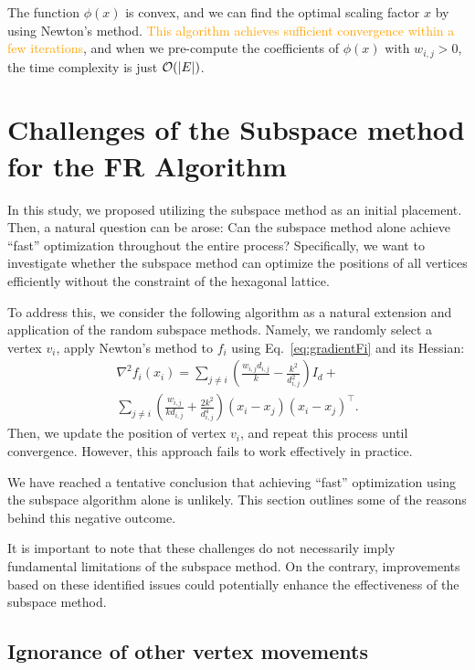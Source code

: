 \documentclass[dvipdfmx,lettersize,journal]{IEEEtran}
\newcommand{\orange}[1]{\textcolor{orange}{#1}}
\begin{document}
The function $\phi(x)$ is convex, and we can find the optimal scaling factor $x$ by using Newton's method.
\orange{This algorithm achieves sufficient convergence within a few iterations}, and when we pre-compute the coefficients of $\phi(x)$ with $w_{i,j} > 0$, the time complexity is just $\order{\abs{E}}$.

\section{Challenges of the Subspace method for the FR Algorithm}\label{sec:problemOfSubspace}

In this study, we proposed utilizing the subspace method as an initial placement. Then, a natural question can be arose: Can the subspace method alone achieve ``fast'' optimization throughout the entire process?
Specifically, we want to investigate whether the subspace method can optimize the positions of all vertices efficiently without the constraint of the hexagonal lattice.

To address this, we consider the following algorithm as a natural extension and application of the random subspace methods. Namely, we randomly select a vertex $v_i$, apply Newton's method to $f_i$ using Eq.~\ref{eq:gradientFi} and its Hessian:
\begin{gather*}
  \nabla^2 f_i(x_i) = \sum_{j \neq i} \left(\frac{w_{i,j}d_{i,j}}{k} - \frac{k^2}{d_{i,j}^2}\right) I_d + \\
  \sum_{j \neq i} \left(\frac{w_{i,j}}{k d_{i,j}} + \frac{2k^2}{d_{i,j}^4}\right) (x_i - x_j)(x_i - x_j)^\top.
\end{gather*}
Then, we update the position of vertex $v_i$, and repeat this process until convergence.
However, this approach fails to work effectively in practice.

We have reached a tentative conclusion that achieving ``fast'' optimization using the subspace algorithm alone is unlikely.
This section outlines some of the reasons behind this negative outcome.

It is important to note that these challenges do not necessarily imply fundamental limitations of the subspace method. On the contrary, improvements based on these identified issues could potentially enhance the effectiveness of the subspace method.

\subsection{Ignorance of other vertex movements}\label{ssec:ignorance}
\end{document}
